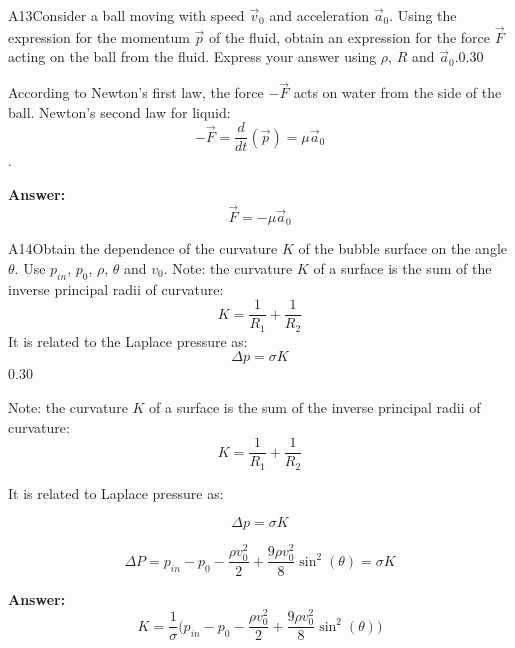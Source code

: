 \documentclass[11pt,a4paper]{article}
\begin{document}
\begin{solcard}{A13}{Consider a ball moving with speed $\vec{v}_0$ and acceleration $\vec{a}_0$. Using the expression for the momentum $\vec{p}$ of the fluid, obtain an expression for the force $\vec{F}$ acting on the ball from the fluid. Express your answer using $\rho$, $R$ and $\vec{a}_0$.}{0.30}

According to Newton's first law, the force $-\vec{F}$ acts on water from the side of the ball. Newton's second law for liquid: $$-\vec{F} = \frac{d}{dt}(\vec{p}) = \mu \vec{a}_0$$.

\par\smallskip\noindent\textbf{Answer:} $$\vec{F} = -\mu \vec{a}_0$$
\end{solcard}

\begin{solcard}{A14}{Obtain the dependence of the curvature $K$ of the bubble surface on the angle $\theta$. Use $p_{in}$, $p_0$, $\rho$, $\theta$ and $v_0$. Note: the curvature $K$ of a surface is the sum of the inverse principal radii of curvature: $$ K=\frac{1}{R_1}+\frac{1}{R_2}$$ It is related to the Laplace pressure as: $$\Delta p = \sigma K$$}{0.30}

Note: the curvature $K$ of a surface is the sum of the inverse principal radii of curvature: $$ K=\frac{1}{R_1}+\frac{1}{R_2}$$


It is related to Laplace pressure as:


$$\Delta p = \sigma K$$


$$\Delta P = p_{in} - p_0 - \frac{\rho v_0^2}{2} + \frac{9\rho v_0^2}{8} \sin^2(\theta) = \sigma K$$

\par\smallskip\noindent\textbf{Answer:} $$K= \frac{1}{\sigma} \big( p_{in} - p_0 - \frac{\rho v_0^2}{2} + \frac{9\rho v_0^2}{8} \sin^2(\theta) \big)$$
\end{solcard}
\end{document}
